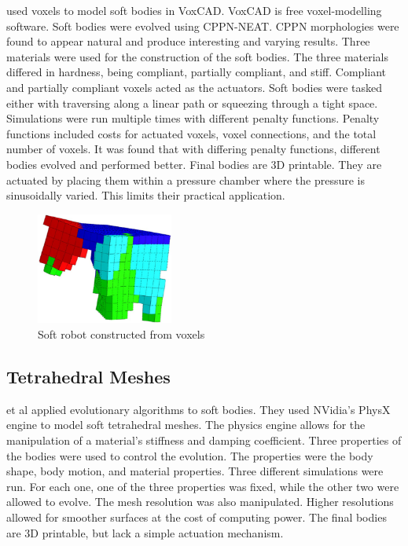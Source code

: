 \cite{Cheney2013} used voxels to model soft bodies in VoxCAD. VoxCAD is free voxel-modelling software. Soft bodies were evolved using CPPN-NEAT. CPPN morphologies were found to appear natural and produce interesting and varying results. Three materials were used for the construction of the soft bodies. The three materials differed in hardness, being compliant, partially compliant, and stiff. Compliant and partially compliant voxels acted as the actuators. Soft bodies were tasked either with traversing along a linear path or squeezing through a tight space. Simulations were run multiple times with different penalty functions. Penalty functions included costs for actuated voxels, voxel connections, and the total number of voxels. It was found that with differing penalty functions, different bodies evolved and performed better. Final bodies are 3D printable. They are actuated by placing them within a pressure chamber where the pressure is sinusoidally varied. This limits their practical application. \citep{Cheney2013,Cheney2015}

\begin{figure}[H]
	\centering
	\includegraphics[width=0.4\textwidth]{Voxel.png}
	\caption[Soft robot constructed from voxels]{Soft robot constructed from voxels \citep{Cheney2013}}
	\label{fig:vox}
\end{figure}

\subsection{Tetrahedral Meshes}

\cite{Rieffel2013} et al applied evolutionary algorithms to soft bodies. They used NVidia's PhysX engine to model soft tetrahedral meshes. The physics engine allows for the manipulation of a material's stiffness and damping coefficient. Three properties of the bodies were used to control the evolution. The properties were the body shape, body motion, and material properties. Three different simulations were run. For each one, one of the three properties was fixed, while the other two were allowed to evolve. The mesh resolution was also manipulated. Higher resolutions allowed for smoother surfaces at the cost of computing power. The final bodies are 3D printable, but lack a simple actuation mechanism. \citep{Rieffel2013}


